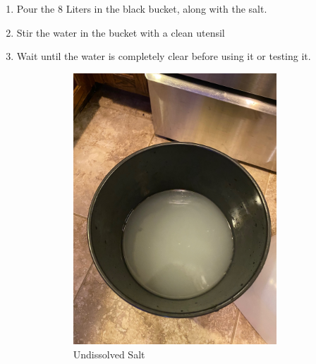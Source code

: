 \documentclass{report}
\begin{document}
\begin{enumerate}
    \item Pour the 8 Liters in the black bucket, along with the salt.
    \item Stir the water in the bucket with a clean utensil
    \item Wait until the water is completely clear before using it or testing it.
    \begin{figure}[H]
        \centering
        \begin{subfigure}{0.5\textwidth}
            \centering
            \includegraphics[width=0.9\textwidth, angle=-90]{UnmixedWater.jpg}
            \caption{Undissolved Salt}
        \end{subfigure}%
        \begin{subfigure}{0.5\textwidth}
            \centering

\end{subfigure}
\end{figure}
\end{enumerate}
\end{document}
